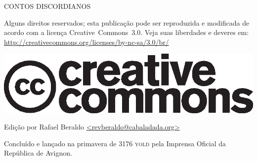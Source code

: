 \thispagestyle{empty}
\begin{center}
{\tiny
CONTOS DISCORDIANOS

\vspace{.5cm}

\begin{minipage}[h]{.6\textwidth}
Alguns direitos reservados; esta publicação pode ser reproduzida e modificada de acordo com a licença \foreignlanguage{english}{Creative~Commons~3.0}. Veja suas liberdades e deveres em: \url{http://creativecommons.org/licenses/by-nc-sa/3.0/br/}
	\begin{center}
	\includegraphics[scale=.2]{cc.eps}
	\end{center}
\end{minipage}

\vspace{.5cm}

\begin{minipage}[h]{.6\textwidth}
Edição por Rafael Beraldo \url{<revberaldo@cabaladada.org>}
\end{minipage}

\vfill

\begin{minipage}[h]{.6\textwidth}
Concluído e lançado na primavera de 3176 \textsc{yold} pela Imprensa Oficial da República de Avignon.
\end{minipage}
}
\end{center}

\newpage
